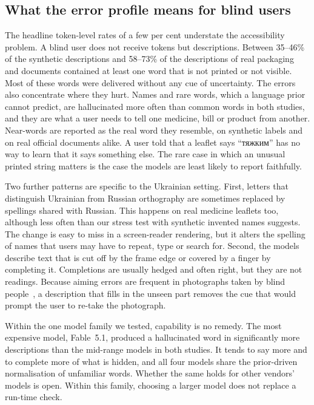 \documentclass[pdflatex,sn-mathphys-num]{sn-jnl}%
\theoremstyle{thmstyleone}%
\theoremstyle{thmstyletwo}%
\theoremstyle{thmstylethree}%
\newcommand{\RangeImg}{35--46}
\newcommand{\RealRangeImg}{58--73}
\begin{document}
\subsection{What the error profile means for blind users}

The headline token-level rates of a few per cent understate the accessibility problem. A blind user does not receive tokens but descriptions. Between \RangeImg\% of the synthetic descriptions and \RealRangeImg\% of the descriptions of real packaging and documents contained at least one word that is not printed or not visible. Most of these words were delivered without any cue of uncertainty. The errors also concentrate where they hurt. Names and rare words, which a language prior cannot predict, are hallucinated more often than common words in both studies, and they are what a user needs to tell one medicine, bill or product from another. Near-words are reported as the real word they resemble, on synthetic labels and on real official documents alike. A user told that a leaflet says ``\foreignlanguage{ukrainian}{тяжким}'' has no way to learn that it says something else. The rare case in which an unusual printed string matters is the case the models are least likely to report faithfully.

Two further patterns are specific to the Ukrainian setting. First, letters that distinguish Ukrainian from Russian orthography are sometimes replaced by spellings shared with Russian. This happens on real medicine leaflets too, although less often than our stress test with synthetic invented names suggests. The change is easy to miss in a screen-reader rendering, but it alters the spelling of names that users may have to repeat, type or search for. Second, the models describe text that is cut off by the frame edge or covered by a finger by completing it. Completions are usually hedged and often right, but they are not readings. Because aiming errors are frequent in photographs taken by blind people~\cite{gurari2018vizwiz}, a description that fills in the unseen part removes the cue that would prompt the user to re-take the photograph.

Within the one model family we tested, capability is no remedy. The most expensive model, Fable~5.1, produced a hallucinated word in significantly more descriptions than the mid-range models in both studies. It tends to say more and to complete more of what is hidden, and all four models share the prior-driven normalisation of unfamiliar words. Whether the same holds for other vendors' models is open. Within this family, choosing a larger model does not replace a run-time check.
\end{document}
